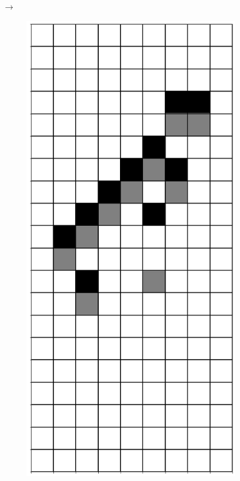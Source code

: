 \documentclass[12pt]{article}
\numberwithin{figure}{section} %
\begin{document}
\begin{figure}[H]
\begin{subfigure}{0.3\textwidth}
     \subcaption{}
   \end{subfigure}
      {\LARGE$\xrightarrow{}$}
      \newline
      \begin{subfigure}{0.3\textwidth}
     \centering
     \includegraphics[angle=270,width=\linewidth]{Section4/22.6}

\end{subfigure}
\end{figure}
\end{document}

